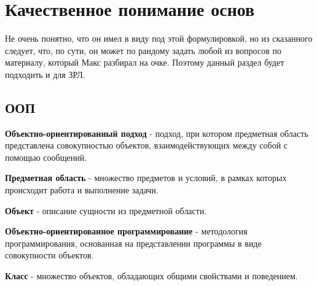 \section{Качественное понимание основ}
\begin{notice}
Не очень понятно, что он имел в виду под этой формулировкой, но из сказанного следует, что, по сути, он может по рандому задать любой из вопросов по материалу, который Макс разбирал на очке. Поэтому данный раздел будет подходить и для ЗРЛ.
\end{notice}
\subsection{ООП}

    \begin{definition}
    \textbf{Объектно-ориентированный подход} - подход, при котором предметная область представлена совокупностью объектов, взаимодействующих между собой с помощью сообщений.
    \end{definition}
    
    \begin{definition}
    \textbf{Предметная область} - множество предметов и условий, в рамках которых происходит работа и выполнение задачи.
    \end{definition}
    \begin{definition}
    \textbf{Объект} - описание сущности из предметной области.
    \end{definition}
    \begin{definition}
    \textbf{Объектно-ориентированное программирование} - методология программирования, основанная на представлении программы в виде совокупности объектов.
    \end{definition}
    \begin{definition}
    \textbf{Класс} - множество объектов, обладающих общими свойствами и поведением.
    \end{definition}

